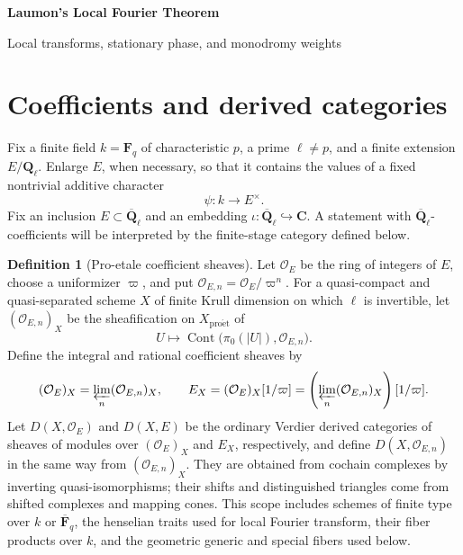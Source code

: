 \documentclass[10pt]{article}
\theoremstyle{definition}
\newtheorem{definition}[theorem]{Definition}
\newcommand{\Fq}{\mathbf F_q}
\newcommand{\Fbar}{\overline{\mathbf F}_q}
\newcommand{\Ql}{\mathbf Q_\ell}
\newcommand{\Qlb}{\overline{\mathbf Q}_\ell}
\begin{document}
\begin{center}
{\large\bfseries Laumon's Local Fourier Theorem\par}
\medskip
{\normalsize Local transforms, stationary phase, and monodromy weights\par}
\end{center}

\begin{abstract}
This note fixes the coefficient, local-monodromy, middle-extension, and
Fourier conventions needed for Laumon's affine-line theorem.  It states the
three local Fourier transforms with their precise representation categories,
the type-3 local exact sequence, and the realness and weight results used in
the theorem.  All derived categories are ordinary Verdier triangulated
categories.
\end{abstract}

\tableofcontents

\section{Coefficients and derived categories}

Fix a finite field \(k=\Fq\) of characteristic \(p\), a prime
\(\ell\ne p\), and a finite extension \(E/\Ql\).  Enlarge \(E\), when
necessary, so that it contains the values of a fixed nontrivial additive
character
\[
                  \psi:k\longrightarrow E^\times .
\]
Fix an inclusion \(E\subset\Qlb\) and an embedding
\(\iota:\Qlb\hookrightarrow\mathbf C\).  A statement with
\(\Qlb\)-coefficients will be interpreted by the finite-stage category
defined below.

\begin{definition}[Pro-etale coefficient sheaves]
Let \(\mathcal O_E\) be the ring of integers of \(E\), choose a uniformizer
\(\varpi\), and put \(\mathcal O_{E,n}=\mathcal O_E/\varpi^n\).  For a
quasi-compact and quasi-separated scheme \(X\) of finite Krull dimension on
which \(\ell\) is invertible, let
\((\mathcal O_{E,n})_X\) be the sheafification on \(X_{\mathrm{pro\acute et}}\)
of
\[
 U\longmapsto
 \operatorname{Cont}\bigl(\pi_0(|U|),\mathcal O_{E,n}\bigr).
\]
Define the integral and rational coefficient sheaves by
\[
 (\mathcal O_E)_X=\varprojlim_n(\mathcal O_{E,n})_X,
 \qquad
 E_X=(\mathcal O_E)_X[1/\varpi]
     =\left(\varprojlim_n(\mathcal O_{E,n})_X\right)[1/\varpi].
\]
Let \(D(X,\mathcal O_E)\) and \(D(X,E)\) be the ordinary Verdier derived
categories of sheaves of modules over \((\mathcal O_E)_X\) and \(E_X\),
respectively, and define \(D(X,\mathcal O_{E,n})\) in the same way from
\((\mathcal O_{E,n})_X\).  They are obtained from cochain complexes by inverting
quasi-isomorphisms; their shifts and distinguished triangles come from
shifted complexes and mapping cones.
This scope includes schemes of finite type over \(k\) or \(\Fbar\), the
henselian traits used for local Fourier transform, their fiber products over
\(k\), and the geometric generic and special fibers used below.
\end{definition}
\end{document}
